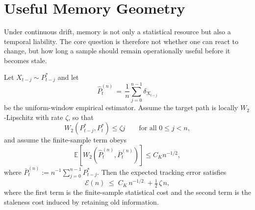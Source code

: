 \section{Useful Memory Geometry}\label{sec:memory_geometry}

Under continuous drift, memory is not only a statistical resource but also a
temporal liability. The core question is therefore not whether one can react to
change, but how long a sample should remain operationally useful before it
becomes stale.

\begin{theorem}\label{thm:lag_error}
Let $X_{t-j} \sim P^*_{t-j}$ and let
\[
  \widehat P_t^{(n)} \,=\, \frac{1}{n}\sum_{j=0}^{n-1} \delta_{X_{t-j}}
\]
be the uniform-window empirical estimator. Assume the target path is locally
$W_2$-Lipschitz with rate $\zeta$, so that
\[
  W_2\!\left(P^*_{t-j}, P^*_t\right) \leq \zeta j
  \qquad \text{for all } 0 \leq j < n,
\]
and assume the finite-sample term obeys
\[
  \mathbb{E}\!\left[W_2\!\left(\widehat P_t^{(n)}, \bar P_t^{(n)}\right)\right]
  \leq C_K n^{-1/2},
\]
where $\bar P_t^{(n)} := n^{-1}\sum_{j=0}^{n-1} P^*_{t-j}$. Then the expected
tracking error satisfies
\[
  \mathcal{E}(n) \;\leq\; C_K\,n^{-1/2} \;+
  \tfrac{1}{2}\,\zeta\,n,
\]
where the first term is the finite-sample statistical cost and the second term
is the staleness cost induced by retaining old information.
\end{theorem}

